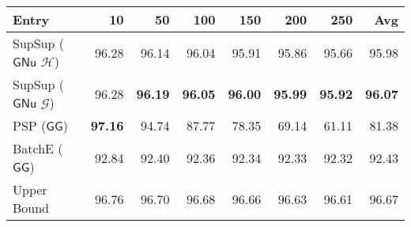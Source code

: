 \begin{tabular}{lrrrrrrr}
\toprule
                                              Entry &    10 &    50 &   100 &   150 &   200 &   250 &   Avg \\
\midrule
 SupSup ($\ensuremath{\mathsf{GNu}}$ $\mathcal{H}$) & 96.28 & 96.14 & 96.04 & 95.91 & 95.86 & 95.66 & 95.98 \\
 SupSup ($\ensuremath{\mathsf{GNu}}$ $\mathcal{G}$) & 96.28 & \textbf{96.19} & \textbf{96.05} & \textbf{96.00} & \textbf{95.99} & \textbf{95.92} & \textbf{96.07} \\
                   PSP ($\ensuremath{\mathsf{GG}}$) & \textbf{97.16} & 94.74 & 87.77 & 78.35 & 69.14 & 61.11 & 81.38 \\
                BatchE ($\ensuremath{\mathsf{GG}}$) & 92.84 & 92.40 & 92.36 & 92.34 & 92.33 & 92.32 & 92.43 \\
                \midrule
                                        Upper Bound & 96.76 & 96.70 & 96.68 & 96.66 & 96.63 & 96.61 & 96.67 \\
\bottomrule
\end{tabular}
